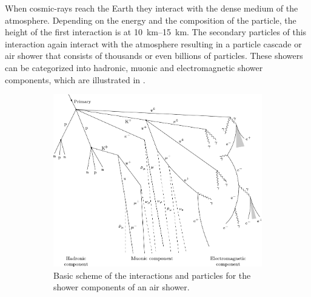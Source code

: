 When cosmic-rays reach the Earth they interact with the dense medium of the atmosphere.
Depending on the energy and the composition of the particle, the height of the first interaction is at \SIrange{10}{15}{km}.
The secondary particles of this interaction again interact with the atmosphere resulting in a particle cascade or air shower that consists of thousands or even billions of particles.
These showers can be categorized into hadronic, muonic and electromagnetic shower components, which are illustrated in .

\begin{figure}
    \centering
    \begin{subfigure}[t]{0.47\textwidth}
        \centering
        \includegraphics[width=\textwidth]{./images/air_shower_components.pdf}
        \caption{Basic scheme of the interactions and particles for the shower components of an air shower. \cite{Barrantes18EAS}}
        \label{fig:air_shower_components}
    \end{subfigure}
    \hfill
    \begin{subfigure}[t]{0.47\textwidth}
        \centering

\end{subfigure}
\end{figure}

